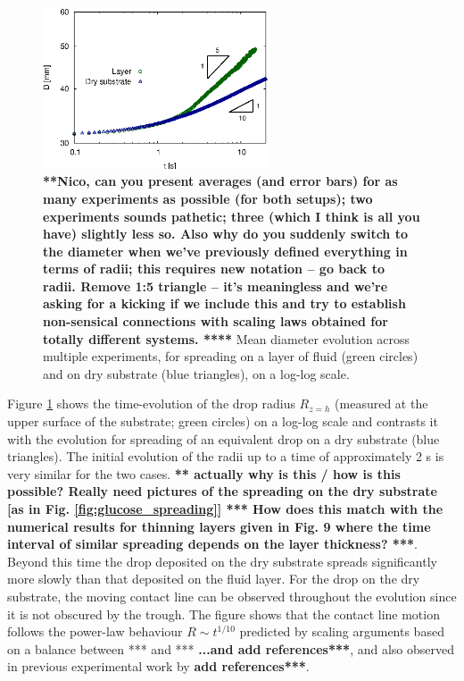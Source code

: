 \documentclass[aip,graphicx]{revtex4-1}
\begin{document}
\begin{figure}[!ht]
\centering
\includegraphics[width=0.6\textwidth]{figures/diam_vs_time_comp_layer_dry.eps}
\caption{{\bf ***Nico, can you present averages (and error bars) for as
  many experiments as possible (for both setups); two experiments
  sounds pathetic; three (which I think is all you have) slightly 
  less so. Also why do you suddenly switch to
  the diameter when we've previously defined everything in terms of
  radii; this requires new notation -- go back to radii. 
  Remove 1:5 triangle -- it's meaningless and we're asking for
  a kicking if we include this and try to establish non-sensical
  connections with scaling laws obtained for totally different
  systems. ****} Mean diameter evolution across multiple experiments, for
  spreading on a layer of fluid (green circles) and on dry substrate
  (blue triangles), on a log-log
  scale. }
\label{fig:diam_vs_time_comp_layer_dry}
\end{figure}


Figure \ref{fig:diam_vs_time_comp_layer_dry} shows the time-evolution
of the drop radius $R_{z=h}$ (measured at the upper surface
of the substrate; green circles) on a log-log scale and
contrasts it with the evolution for spreading of an equivalent drop 
on a dry substrate (blue triangles). The initial evolution 
of the radii up to a time of approximately 2 s is very similar for the two 
cases. {\bf *** actually why is this /  how is this possible? Really
  need pictures of the spreading on the dry substrate [as in Fig.
\ref{fig:glucose_spreading}] *** How does this match with the numerical results for thinning layers given in Fig. 9 where the time interval of similar spreading depends on the layer thickness? ***}.
Beyond this time the drop deposited on the dry substrate spreads
significantly more slowly than that deposited on the fluid layer.
For the drop on the dry substrate, the moving contact line can be
observed throughout the evolution since it is not obscured by the
trough. The figure shows that the contact line motion follows
the power-law behaviour $R \sim t^{1/10}$ predicted by scaling
arguments based on a balance between *** and *** {\bf ...and add 
references***}, and also observed in previous experimental work by {\bf  add 
references***}.
\end{document}
